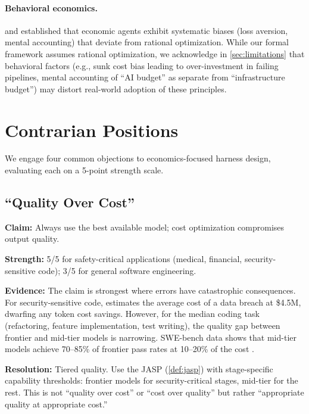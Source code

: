 \documentclass[11pt, a4paper, copyright]{googledeepmind}
\begin{document}
\paragraph{Behavioral economics.}
\citet{kahneman1979} and \citet{thaler1999} established that economic agents exhibit systematic biases (loss aversion, mental accounting) that deviate from rational optimization. While our formal framework assumes rational optimization, we acknowledge in \cref{sec:limitations} that behavioral factors (e.g., sunk cost bias leading to over-investment in failing pipelines, mental accounting of ``AI budget'' as separate from ``infrastructure budget'') may distort real-world adoption of these principles.


\section{Contrarian Positions}\label{sec:contrarian}

We engage four common objections to economics-focused harness design, evaluating each on a 5-point strength scale.

\subsection{``Quality Over Cost''}

\textbf{Claim:} Always use the best available model; cost optimization compromises output quality.

\textbf{Strength:} 5/5 for safety-critical applications (medical, financial, security-sensitive code); 3/5 for general software engineering.

\textbf{Evidence:} The claim is strongest where errors have catastrophic consequences. For security-sensitive code, \citet{ibmponemon2025} estimates the average cost of a data breach at \$4.5M, dwarfing any token cost savings. However, for the median coding task (refactoring, feature implementation, test writing), the quality gap between frontier and mid-tier models is narrowing. SWE-bench data shows that mid-tier models achieve 70--85\% of frontier pass rates at 10--20\% of the cost \citep{jetbrains2025}.

\textbf{Resolution:} Tiered quality. Use the JASP (\cref{def:jasp}) with stage-specific capability thresholds: frontier models for security-critical stages, mid-tier for the rest. This is not ``quality over cost'' or ``cost over quality'' but rather ``appropriate quality at appropriate cost.''
\end{document}
